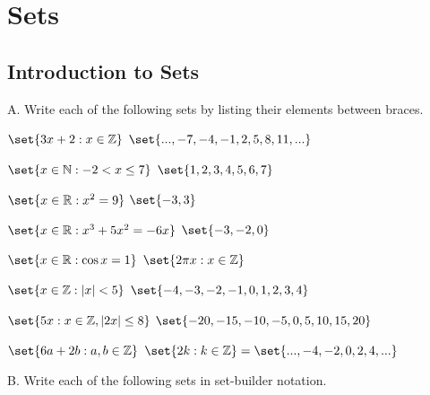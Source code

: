 \documentclass[DIN, pagenumber=false, fontsize=11pt, parskip=half]{scrartcl}
\title{}
\author{} %
\date{}
\begin{document}
\maketitle


\section{Sets}

\subsection{Introduction to Sets}

\begin{exercise}{A.}
    Write each of the following sets by listing their elements between braces.
\end{exercise}

\begin{problems}
    \problem $\set{3x+2:x\in\mathbb{Z}}$
    \answer  $\set{...,-7,-4,-1,2,5,8,11,...}$

    \problem $\set{x \in \mathbb{N}:-2 < x \leq 7}$
    \answer  $\set{1,2,3,4,5,6,7}$

    \problem $\set{x \in \mathbb{R}: x^2 = 9}$
    \answer  $\set{-3,3}$

    \problem $\set{x \in \mathbb{R}:x^3+5x^2=-6x}$
    \answer  $\set{-3,-2,0}$

    \problem $\set{x \in \mathbb{R}: \cos{x}=1}$
    \answer  $\set{2\pi x: x \in \mathbb{Z}}$

    \problem $\set{x\in\mathbb{Z}:\abs{x} < 5}$
    \answer  $\set{-4,-3,-2,-1,0,1,2,3,4}$

    \problem $\set{5x:x\in\mathbb{Z},\abs{2x}\leq8}$
    \answer  $\set{-20,-15,-10,-5,0,5,10,15,20}$

    \problem $\set{6a + 2b : a,b\in\mathbb{Z}}$
    \answer  $\set{2k:k\in\mathbb{Z}} = \set{...,-4,-2,0,2,4,...}$
\end{problems}

\begin{exercise}{B.}
    Write each of the following sets in set-builder notation.
\end{exercise}
\end{document}
